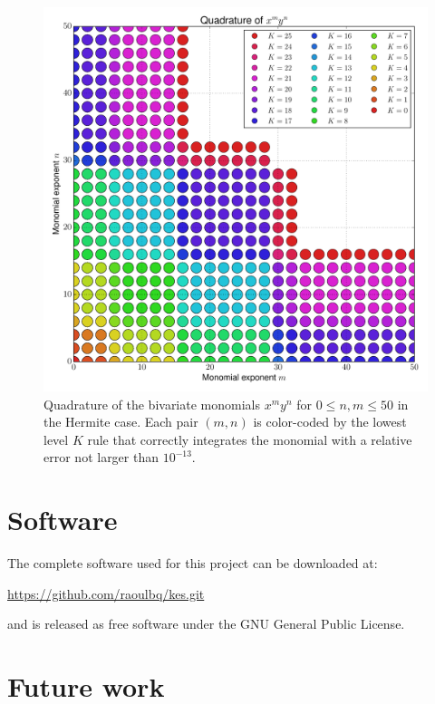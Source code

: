 \documentclass[a4paper,10pt]{article}
\begin{document}
\begin{figure}[h]
  \centering
  \includegraphics[width=\linewidth]{./img/monomial_errors_hermitephy_2D.pdf}
  \caption{Quadrature of the bivariate monomials $x^m y^n$ for $0 \leq n, m \leq 50$
  in the Hermite case.
  Each pair $(m,n)$ is color-coded by the lowest level $K$ rule that correctly
  integrates the monomial with a relative error not larger than $10^{-13}$.}
  \label{fig:monomial_errors_hermitephy_2D}
\end{figure}


\FloatBarrier
\section{Software}

The complete software used for this project can be downloaded at:

\begin{center}
  \url{https://github.com/raoulbq/kes.git}
\end{center}

and is released as free software under the GNU General Public License.


\FloatBarrier
\section{Future work}
\end{document}
